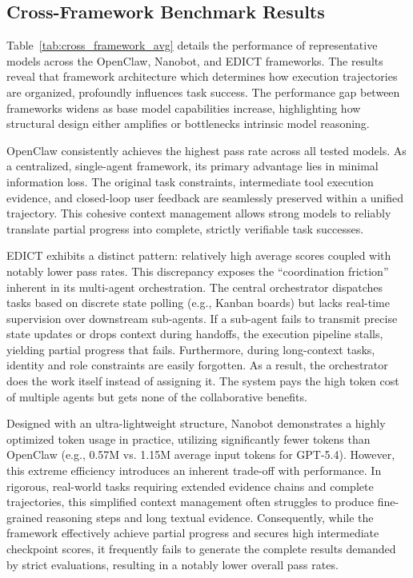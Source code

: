 
\subsection{Cross-Framework Benchmark Results}
Table~\ref{tab:cross_framework_avg} details the performance of representative models across the OpenClaw, Nanobot, and EDICT frameworks. The results reveal that framework architecture which determines how execution trajectories are organized, profoundly influences task success. The performance gap between frameworks widens as base model capabilities increase, highlighting how structural design either amplifies or bottlenecks intrinsic model reasoning.

OpenClaw consistently achieves the highest pass rate across all tested models. As a centralized, single-agent framework, its primary advantage lies in minimal information loss. The original task constraints, intermediate tool execution evidence, and closed-loop user feedback are seamlessly preserved within a unified trajectory. This cohesive context management allows strong models to reliably translate partial progress into complete, strictly verifiable task successes.

EDICT exhibits a distinct pattern: relatively high average scores coupled with notably lower pass rates. This discrepancy exposes the ``coordination friction'' inherent in its multi-agent orchestration. The central orchestrator dispatches tasks based on discrete state polling (e.g., Kanban boards) but lacks real-time supervision over downstream sub-agents. If a sub-agent fails to transmit precise state updates or drops context during handoffs, the execution pipeline stalls, yielding partial progress that fails. Furthermore, during long-context tasks, identity and role constraints are easily forgotten. As a result, the orchestrator does the work itself instead of assigning it. The system pays the high token cost of multiple agents but gets none of the collaborative benefits.

Designed with an ultra-lightweight structure, Nanobot demonstrates a highly optimized token usage in practice, utilizing significantly fewer tokens than OpenClaw (e.g., 0.57M vs. 1.15M average input tokens for GPT-5.4). However, this extreme efficiency introduces an inherent trade-off with performance. In rigorous, real-world tasks requiring extended evidence chains and complete trajectories, this simplified context management often struggles to produce fine-grained reasoning steps and long textual evidence. Consequently, while the framework effectively achieve partial progress and secures high intermediate checkpoint scores, it frequently fails to generate the complete results demanded by strict evaluations, resulting in a notably lower overall pass rates.






